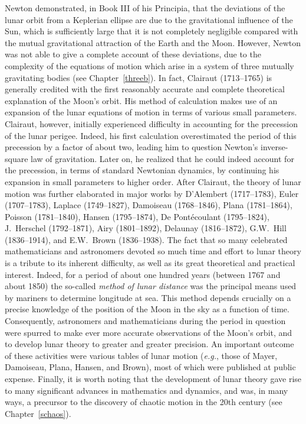 Newton demonstrated, in Book III of his Principia, that the deviations of the lunar orbit from a Keplerian ellipse are due to the
gravitational influence of the Sun, which is  sufficiently large that it is not completely negligible compared with the mutual
gravitational attraction of the Earth and the Moon.
However, Newton was not able to give a complete account of these
deviations, due to the complexity of the equations of motion which arise in a system of three mutually
gravitating bodies (see Chapter~\ref{threeb}).  In fact, Clairaut (1713--1765) is generally credited with the first reasonably accurate and complete theoretical explanation  of the Moon's orbit. 
His method of calculation makes use of an  expansion of the lunar equations of motion in terms of various small parameters.
Clairaut, however, initially experienced difficulty in accounting for the precession of the lunar perigee. Indeed, his first calculation
overestimated the period of this precession  by a factor of about two, leading him to question Newton's
inverse-square law of gravitation. Later on, he realized that he could indeed account for the precession, in terms of
standard Newtonian dynamics, by
continuing his expansion in small parameters to higher order. After Clairaut, the theory of lunar motion was further elaborated in major works by
D'Alembert (1717--1783), Euler (1707--1783), Laplace (1749--1827), Damoiseau (1768--1846), Plana (1781--1864), Poisson (1781--1840), Hansen (1795--1874),  De Pont\'{e}coulant (1795--1824), J.~Herschel (1792--1871), Airy (1801--1892), Delaunay (1816--1872), G.W.~Hill (1836--1914), and E.W.~Brown (1836--1938). The fact that so many celebrated mathematicians and astronomers devoted so much time and effort to lunar
theory is a tribute to its inherent difficulty, as well as its great theoretical and practical interest. Indeed, for a period
of about one hundred years (between 1767 and about 1850) the
so-called {\em method of lunar distance}\/ was the principal means used by mariners to determine
longitude at sea. This method depends crucially on a precise   knowledge of the position of the
Moon in the sky as a function of time. Consequently, astronomers and mathematicians during the
period in question  were spurred to make ever more accurate observations of the Moon's orbit, and to develop lunar theory
to greater and greater precision. An important outcome of these activities were various  tables of lunar motion ({\em e.g.}, those
of Mayer, Damoiseau, Plana, Hansen, and Brown), most of which were 
published at public expense.  Finally, it is worth noting that the development  of lunar theory gave rise to many
significant advances in mathematics and  dynamics, and was, in many ways, a precursor to the discovery of 
chaotic motion in the 20th century (see Chapter~\ref{schaos}). 

